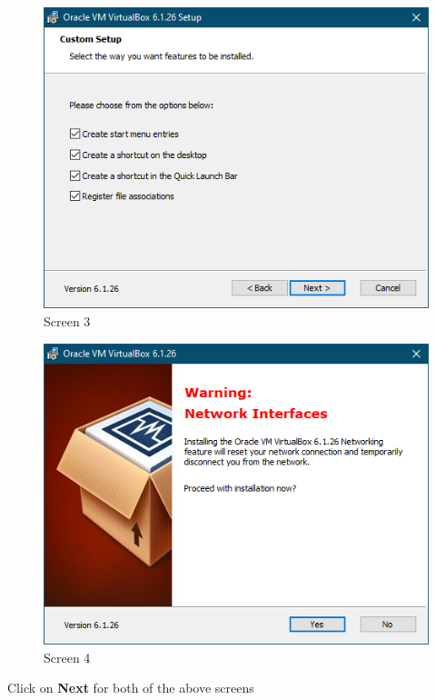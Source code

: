 \documentclass[a4paper, 12pt, titlepage]{report}
\begin{document}
\begin{multicols}{2}
\begin{figure}[H]
    \centering
    \includegraphics[scale=0.5]{pics/vb3.PNG}
    \caption{Screen 3}
\end{figure}
\begin{figure}[H]
    \centering
    \includegraphics[scale=0.5]{pics/vb4.PNG}
    \caption{Screen 4}
\end{figure}
\end{multicols}
Click on \textbf{Next} for both of the above screens
\end{document}
